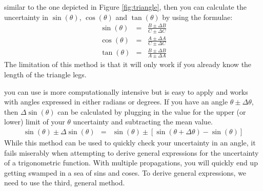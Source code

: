 		 similar to the one depicted in Figure \ref{fig:triangle}, then you can calculate the uncertainty in $\sin\left(\theta\right)$, $\cos\left(\theta\right)$ and $\tan\left(\theta\right)$ by using the formulae:
		\begin{eqnarray*}
			\sin\left(\theta\right)&=&\frac{B\pm\Delta{B}}{C\pm\Delta{C}}\\
			\cos\left(\theta\right)&=&\frac{A\pm\Delta{A}}{C\pm\Delta{C}}\\
			\tan\left(\theta\right)&=&\frac{B\pm\Delta{B}}{A\pm\Delta{A}}
		\end{eqnarray*}
		The limitation of this method is that it will only work if you already know the length of the triangle legs.

		 you can use is more computationally intensive but is easy to apply and works with angles expressed in either radians or degrees.  If you have an angle $\theta\pm\Delta\theta$, then $\Delta\sin\left(\theta\right)$ can be calculated by plugging in the value for the upper (or lower) limit of your $\theta$ uncertainty and subtracting the mean value.
		\begin{eqnarray*}
			\sin\left(\theta\right) \pm\Delta\sin\left(\theta\right) &=&\sin\left(\theta\right) \pm\left[\sin\left(\theta+\Delta\theta\right)-\sin\left(\theta\right)\right]
		\end{eqnarray*}
		While this method can be used to quickly check your uncertainty in an angle, it fails miserably when attempting to derive general expressions for the uncertainty of a trigonometric function.  With multiple propagations, you will quickly end up getting swamped in a sea of sins and coses.  To derive general expressions, we need to use the third, general method.

